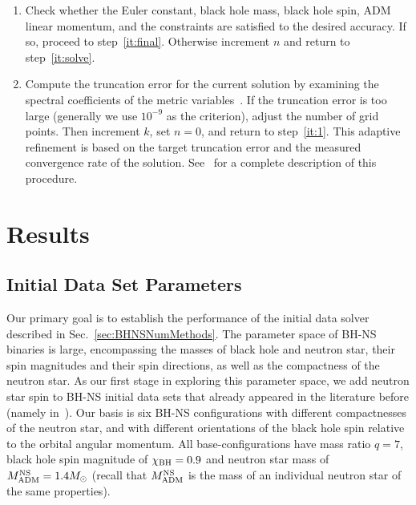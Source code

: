 \begin{enumerate}
\item
\label{it:secondlast}
Check whether the Euler constant, black hole mass, black hole spin, ADM linear momentum, and the constraints 
are satisfied to the desired accuracy. If so, proceed to step~\ref{it:final}. Otherwise increment $n$ and return to step~\ref{it:solve}.

\item 
\label{it:final}
Compute the truncation error for the current solution by examining the
spectral coefficients of the metric variables~\citep{Szilagyi:2014fna}.
If the truncation error is too large (generally we use $10^{-9}$ as
the criterion), adjust the number of grid points. Then increment $k$, set $n=0$, and return to
step~\ref{it:1}. This adaptive refinement is based on the target
truncation error and the measured convergence rate of the
solution. See~\cite{Szilagyi:2014fna} for a complete description of
this procedure.

\end{enumerate}

\section{Results}
\label{sec:BHNSResults}




\subsection{Initial Data Set Parameters}


Our primary goal is to establish the performance of the initial data
solver described in Sec.~\ref{sec:BHNSNumMethods}. The parameter
space of BH-NS binaries is large, encompassing the masses of black
hole and neutron star, their spin magnitudes and their spin
directions, as well as the compactness of the neutron star. As our
first stage in exploring this parameter space, we add neutron star
spin to BH-NS initial data sets that already appeared in the
literature before (namely in~\cite{Foucart:2013a}). Our basis is six BH-NS configurations with
different compactnesses  of the neutron star, and with different
orientations of the black hole spin relative to
the orbital angular momentum. All base-configurations have mass ratio
$q=7$,
black hole spin magnitude of $\chi_{\rm BH}=0.9$ and
neutron star mass of
$M^{\rm NS}_{\rm ADM}=1.4M_{\odot}$ (recall that $M^{\rm NS}_{\rm ADM}$ is the mass of an individual neutron star of the same properties). 

